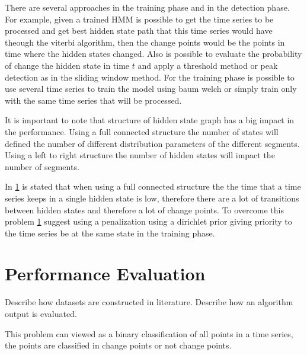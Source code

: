 There are several approaches in the training phase and in the detection phase. For example, given a trained HMM is possible to get the time series to be processed and get best hidden state path that this time series would have theough the viterbi algorithm, then the change points would be the points in time where the hidden states changed. Also is possible to evaluate the probability of change the hidden state in time $t$ and apply a threshold method or peak detection as in the sliding window method. For the training phase is possible to use several time series to train the model using baum welch or simply train only with the same time series that will be processed.

It is important to note that structure of hidden state graph has a big impact in the performance. Using a full connected structure the number of states will defined the number of different distribution parameters of the different segments. Using a left to right structure the number of hidden states will impact the number of segments.

In \ref{} is stated that when using a full connected structure the the time that a time series keeps in a single hidden state is low, therefore there are a lot of transitions between hidden states and therefore a lot of change points. To overcome this problem \ref{} suggest using a penalization using a dirichlet prior giving priority to the time series be at the same state in the training phase.


\section{Performance Evaluation}
  Describe how datasets are constructed in literature. Describe how an algorithm output is evaluated.

This problem can viewed as a binary classification of all points in a time series, the points are classified in change points or not change points.

